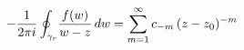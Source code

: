 \documentclass[preview]{standalone}
\begin{document}
\begin{align*}
\special{dvisvgm:raw <g id='unique000'>}-\frac{1}{2\pi i}\oint_{\gamma_r}\!\frac{f(w)}{w-z}\,dw= \sum_{m=1}^{\infty} c_{-m}\,(z-z_0)^{-m}\special{dvisvgm:raw </g>}
\end{align*}
\end{document}
